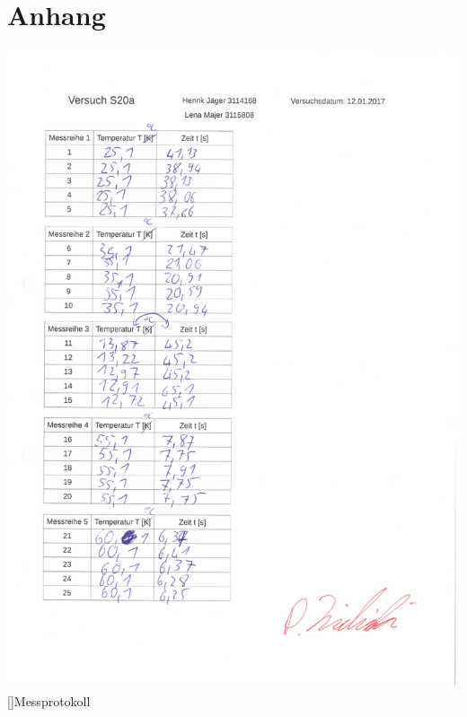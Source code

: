 \documentclass[12pt,a4paper,]{scrreprt}
\begin{document}
	\chapter{Anhang}
    \includegraphics[scale=0.6]{protokoll.pdf}
    []{Messprotokoll}
	
\end{document}
